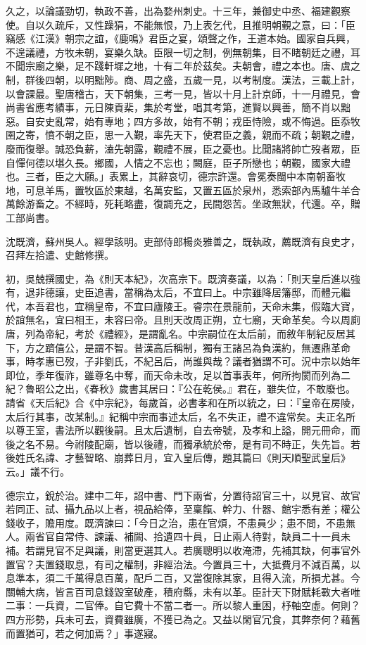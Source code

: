\begin{pinyinscope}
 久之，以論議勁切，執政不善，出為婺州刺史。十三年，兼御史中丞、福建觀察使。自以久疏斥，又性躁狷，不能無恨，乃上表乞代，且推明朝覲之意，曰：「臣竊感《江漢》朝宗之誼，《鹿鳴》君臣之宴，頌聲之作，王道本始。國家自兵興，不遑議禮，方牧未朝，宴樂久缺。臣限一切之制，例無朝集，目不睹朝廷之禮，耳不聞宗廟之樂，足不踐軒墀之地，十有二年於茲矣。夫朝會，禮之本也。唐、虞之制，群後四朝，以明黜陟。商、周之盛，五歲一見，以考制度。漢法，三載上計，以會課最。聖唐稽古，天下朝集，三考一見，皆以十月上計京師，十一月禮見，會尚書省應考績事，元日陳貢棐，集於考堂，唱其考第，進賢以興善，簡不肖以黜惡。自安史亂常，始有專地；四方多故，始有不朝；戎臣恃險，或不悔過。臣忝牧圉之寄，憤不朝之臣，思一入覲，率先天下，使君臣之義，親而不疏；朝覲之禮，廢而復舉。誠恐負薪，溘先朝露，覲禮不展，臣之憂也。比聞諸將帥亡歿者眾，臣自憚何德以堪久長。鄉國，人情之不忘也；闕庭，臣子所戀也；朝覲，國家大禮也。三者，臣之大願。」表累上，其辭哀切，德宗許還。會冕奏閩中本南朝畜牧地，可息羊馬，置牧區於東越，名萬安監，又置五區於泉州，悉索部內馬驢牛羊合萬餘游畜之。不經時，死耗略盡，復調充之，民間怨苦。坐政無狀，代還。卒，贈工部尚書。



 沈既濟，蘇州吳人。經學該明。吏部侍郎楊炎雅善之，既執政，薦既濟有良史才，召拜左拾遣、史館修撰。



 初，吳兢撰國史，為《則天本紀》，次高宗下。既濟奏議，以為：「則天皇后進以強有，退非德讓，史臣追書，當稱為太后，不宜曰上。中宗雖降居籓邸，而體元繼代，本吾君也，宜稱皇帝，不宜曰廬陵王。睿宗在景龍前，天命未集，假臨大寶，於誼無名，宜曰相王，未容曰帝。且則天改周正朔，立七廟，天命革矣。今以周廁唐，列為帝紀，考於《禮經》，是謂亂名。中宗嗣位在太后前，而敘年制紀反居其下，方之躋僖公，是謂不智。昔漢高后稱制，獨有王諸呂為負漢約，無遷鼎革命事，時孝惠已歿，子非劉氏，不紀呂后，尚誰與哉？議者猶謂不可。況中宗以始年即位，季年復祚，雖尊名中奪，而天命未改，足以首事表年，何所拘閡而列為二紀？魯昭公之出，《春秋》歲書其居曰：『公在乾侯。』君在，雖失位，不敢廢也。請省《天后紀》合《中宗紀》，每歲首，必書孝和在所以統之，曰：『皇帝在房陵，太后行其事，改某制。』紀稱中宗而事述太后，名不失正，禮不違常矣。夫正名所以尊王室，書法所以觀後嗣。且太后遺制，自去帝號，及孝和上謚，開元冊命，而後之名不易。今祔陵配廟，皆以後禮，而獨承統於帝，是有司不時正，失先旨。若後姓氏名諱、才藝智略、崩葬日月，宜入皇后傳，題其篇曰《則天順聖武皇后》云。」議不行。



 德宗立，銳於治。建中二年，詔中書、門下兩省，分置待詔官三十，以見官、故官若同正、試、攝九品以上者，視品給俸，至稟餼、幹力、什器、館宇悉有差；權公錢收子，贍用度。既濟諫曰：「今日之治，患在官煩，不患員少；患不問，不患無人。兩省官自常侍、諫議、補闕、拾遺四十員，日止兩人待對，缺員二十一員未補。若謂見官不足與議，則當更選其人。若廣聰明以收淹滯，先補其缺，何事官外置官？夫置錢取息，有司之權制，非經治法。今置員三十，大抵費月不減百萬，以息準本，須二千萬得息百萬，配戶二百，又當復除其家，且得入流，所損尤甚。今關輔大病，皆言百司息錢毀室破產，積府縣，未有以革。臣計天下財賦耗斁大者唯二事：一兵資，二官俸。自它費十不當二者一。所以黎人重困，杼軸空虛。何則？四方形勢，兵未可去，資費雖廣，不獲已為之。又益以閑官冗食，其弊奈何？藉舊而置猶可，若之何加焉？」事遂寢。




\end{pinyinscope}
